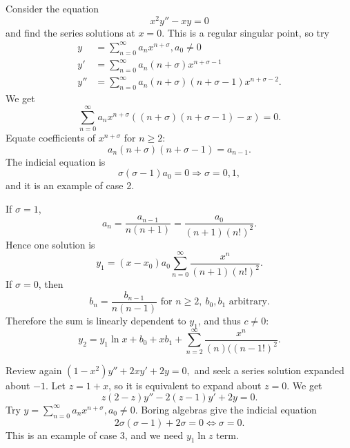 \documentclass[10pt]{article}
\def\ge{\geqslant}
\begin{document}
    \begin{example}
        Consider the equation
        \begin{equation}\label{eq:19.1}
            x^2y''-xy=0
        \end{equation}
        and find the series solutions at $x=0$. This is a regular singular point, so try
        \begin{align*}
            y&=\sum_{n=0}^{\infty}a_nx^{n+\sigma}, a_0\neq 0\\
            y'&= \sum_{n=0}^{\infty}a_n(n+\sigma)x^{n+\sigma-1}\\
            y''&=\sum_{n=0}^{\infty} a_n(n+\sigma)(n+\sigma-1)x^{n+\sigma-2}.
        \end{align*}
        We get 
        \[
            \sum_{n=0}^{\infty}a_nx^{n+\sigma}\left( (n+\sigma)(n+\sigma-1)-x \right)=0.
        \]
        Equate coefficients of $ x^{n+\sigma} $ for $n\ge 2$:
        \[
            a_n(n+\sigma)(n+\sigma-1)=a_{n-1}.
        \]
        The indicial equation is 
        \[
            \sigma(\sigma-1)a_0=0 \Longrightarrow \sigma=0,1,
        \]
        and it is an example of case 2.

        If $ \sigma=1 $, 
        \[
            a_n = \frac{a_{n-1}}{n(n+1)} = \frac{a_0}{(n+1)(n!)^2}.
        \]
        Hence one solution is 
        \[
            y_1 = (x-x_0) a_0\sum_{n=0}^{\infty} \frac{x^n}{(n+1)(n!)^2}.
        \]
        If $ \sigma=0 $, then 
        \[
            b_n = \frac{b_{n-1}}{n(n-1)} \text{ for }n\ge 2,\ b_0,b_1 \text{ arbitrary}.
        \]
        Therefore the sum is linearly dependent to $y_1$, and thus $c\neq 0$:
        \[
            y_2 = y_1 \ln x + b_0 + xb_1 + \sum_{n=2}^{\infty}\frac{x^n}{(n)((n-1!)^2}.
        \]
    \end{example}
    \begin{example}
        Review again $(1-x^2)y''+2xy'+2y=0,$ and seek a series solution expanded about $-1$. Let $z=1+x$, so it is equivalent to expand about $z=0$. We get 
        \[
            z(2-z)y''-2(z-1)y'+2y=0.
        \]
        Try $y=\sum_{n=0}^{\infty}a_nx^{n+\sigma}, a_0\neq 0$. Boring algebras give the indicial equation 
        \[
            2\sigma(\sigma-1)+2\sigma=0 \Longleftrightarrow \sigma=0.
        \]
        This is an example of case 3, and we need $ y_1\ln z $ term.
    \end{example}
\end{document}
